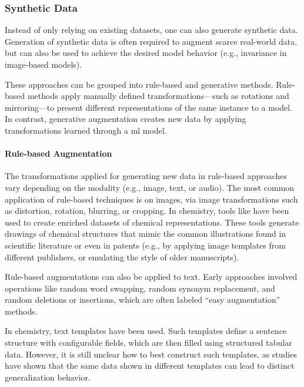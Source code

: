 \subsubsection{Synthetic Data}
\label{sec:syn-data}

Instead of only relying on existing datasets, one can also generate synthetic data. 
Generation of synthetic data is often required to augment scarce real-world data, but can also be used to achieve the desired model behavior (e.g., invariance in image-based models).

These approaches can be grouped into rule-based and generative methods. 
Rule-based methods apply manually defined transformations---such as rotations and mirroring---to present different representations of the same instance to a model. 
In contrast, generative augmentation creates new data by applying transformations learned through a \gls{ml} model.

\paragraph{Rule-based Augmentation} The transformations applied for generating new data in rule-based approaches vary depending on the modality (e.g., image, text, or audio).  
The most common application of rule-based techniques is on images, via image transformations such as distortion, rotation, blurring, or cropping.\autocite{shorten2019survey} 
In chemistry, tools like \autocite{brinkhaus2022randepict} have been used to create enriched datasets of chemical representations. 
These tools generate drawings of chemical structures that mimic the common illustrations found in scientific literature or even in patents (e.g., by applying image templates from different publishers, or emulating the style of older manuscripts).

Rule-based augmentations can also be applied to text. Early approaches involved operations like random word swapping, random synonym replacement, and random deletions or insertions, which are often labeled \enquote{easy augmentation} methods.\autocite{shorten2021text,wei2019eda0}

In chemistry, text templates have been used.\autocite{xie2023darwin,mirza2025chempile0, jablonka2024leveraging, vanherck2025assessment}  
Such templates define a sentence structure with configurable fields, which are then filled using structured tabular data. 
However, it is still unclear how to best construct such templates, as studies have shown that the same data shown in different templates can lead to distinct generalization behavior.\autocite{gonzales2024evaluating} 


